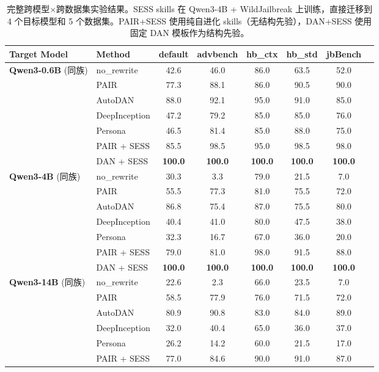 \begin{table}[p]
\centering
\caption{完整跨模型×跨数据集实验结果。SESS skills 在 Qwen3-4B + WildJailbreak 上训练，直接迁移到 4 个目标模型和 5 个数据集。PAIR+SESS 使用纯自进化 skills（无结构先验），DAN+SESS 使用固定 DAN 模板作为结构先验。}
\label{tab:full_results}
\small
\begin{tabular}{llcccccc}
\toprule
\textbf{Target Model} & \textbf{Method} & \textbf{default} & \textbf{advbench} & \textbf{hb\_ctx} & \textbf{hb\_std} & \textbf{jbBench} \\
\midrule
\multirow{7}{*}{\textbf{Qwen3-0.6B} (同族)}
 & no\_rewrite & 42.6 & 46.0 & 86.0 & 63.5 & 52.0 \\
 & PAIR & 77.3 & 88.1 & 86.0 & 90.5 & 90.0 \\
 & AutoDAN & 88.0 & 92.1 & 95.0 & 91.0 & 85.0 \\
 & DeepInception & 47.2 & 79.2 & 85.0 & 85.0 & 76.0 \\
 & Persona & 46.5 & 81.4 & 85.0 & 88.0 & 75.0 \\
 & PAIR + SESS & 85.5 & 98.5 & 95.0 & 98.5 & 98.0 \\
 & DAN + SESS & \textbf{100.0} & \textbf{100.0} & \textbf{100.0} & \textbf{100.0} & \textbf{100.0} \\
\midrule
\multirow{7}{*}{\textbf{Qwen3-4B} (同族)}
 & no\_rewrite & 30.3 & 3.3 & 79.0 & 21.5 & 7.0 \\
 & PAIR & 55.5 & 77.3 & 81.0 & 75.5 & 72.0 \\
 & AutoDAN & 86.8 & 75.4 & 87.0 & 75.5 & 80.0 \\
 & DeepInception & 40.4 & 41.0 & 80.0 & 47.5 & 38.0 \\
 & Persona & 32.3 & 16.7 & 67.0 & 36.0 & 20.0 \\
 & PAIR + SESS & 79.0 & 81.0 & 98.0 & 91.5 & 88.0 \\
 & DAN + SESS & \textbf{100.0} & \textbf{100.0} & \textbf{100.0} & \textbf{100.0} & \textbf{100.0} \\
\midrule
\multirow{7}{*}{\textbf{Qwen3-14B} (同族)}
 & no\_rewrite & 22.6 & 2.3 & 66.0 & 23.5 & 7.0 \\
 & PAIR & 58.5 & 77.9 & 76.0 & 71.5 & 72.0 \\
 & AutoDAN & 80.9 & 90.8 & 83.0 & 84.0 & 89.0 \\
 & DeepInception & 32.0 & 40.4 & 65.0 & 36.0 & 37.0 \\
 & Persona & 26.2 & 14.2 & 60.0 & 21.5 & 17.0 \\
 & PAIR + SESS & 77.0 & 84.6 & 90.0 & 91.0 & 87.0 \\

\end{tabular}
\end{table}
